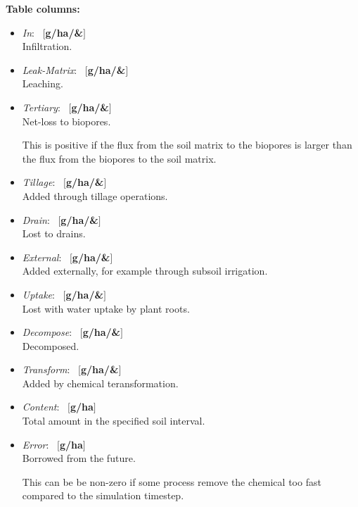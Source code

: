 \documentclass[a4paper]{article}
\begin{document}
\textbf{Table columns:}\begin{itemize}
\item \textit{In}: ~$[$\textbf{g/ha/\&}$]$\\
Infiltration.
\item \textit{Leak-Matrix}: ~$[$\textbf{g/ha/\&}$]$\\
Leaching.
\item \textit{Tertiary}: ~$[$\textbf{g/ha/\&}$]$\\
Net-loss to biopores.

This is positive if the flux from the soil matrix to the biopores
is larger than the flux from the biopores to the soil matrix.
\item \textit{Tillage}: ~$[$\textbf{g/ha/\&}$]$\\
Added through tillage operations.
\item \textit{Drain}: ~$[$\textbf{g/ha/\&}$]$\\
Lost to drains.
\item \textit{External}: ~$[$\textbf{g/ha/\&}$]$\\
Added externally, for example through subsoil irrigation.
\item \textit{Uptake}: ~$[$\textbf{g/ha/\&}$]$\\
Lost with water uptake by plant roots.
\item \textit{Decompose}: ~$[$\textbf{g/ha/\&}$]$\\
Decomposed.
\item \textit{Transform}: ~$[$\textbf{g/ha/\&}$]$\\
Added by chemical teransformation.
\item \textit{Content}: ~$[$\textbf{g/ha}$]$\\
Total amount in the specified soil interval.
\item \textit{Error}: ~$[$\textbf{g/ha}$]$\\
Borrowed from the future.

This can be be non-zero if some process remove the chemical too
fast compared to the simulation timestep.
\end{itemize}
\end{document}
